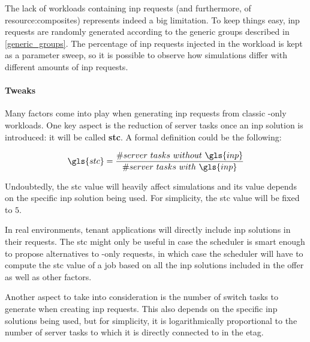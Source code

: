 The lack of workloads containing \gls{inp} requests (and furthermore, of \glspl{resource:composite}) represents indeed a big limitation.
To keep things easy, \gls{inp} requests are randomly generated according to the generic groups described in \autoref{generic_groups}.
The percentage of \gls{inp} requests injected in the workload is kept as a parameter sweep, so it is possible to observe how simulations differ with different amounts of \gls{inp} requests.

\paragraph{Tweaks} \label{workload_tweaks}
Many factors come into play when generating \gls{inp} requests from classic -only workloads.
One key aspect is the reduction of server tasks once an \gls{inp} solution is introduced: it will be called \textbf{\gls{stc}}.
A formal definition could be the following:

\begin{equation}
\label{stc_formula}
\gls{stc}=\dfrac{\#server\ tasks\ without\ \gls{inp}}{\#server\ tasks\ with\ \gls{inp}}
\end{equation}

Undoubtedly, the \gls{stc} value will heavily affect simulations and its value depends on the specific \gls{inp} solution being used.
For simplicity, the \gls{stc} value will be fixed to $5$. %

In real environments, tenant applications will directly include \gls{inp} solutions in their requests.
The \gls{stc} might only be useful in case the scheduler is smart enough to propose alternatives to -only requests, in which case the scheduler will have to compute the \gls{stc} value of a job based on all the \gls{inp} solutions included in the offer as well as other factors.

Another aspect to take into consideration is the number of switch tasks to generate when creating \gls{inp} requests.
This also depends on the specific \gls{inp} solutions being used, but for simplicity, it is logarithmically proportional to the number of server tasks to which it is directly connected to in the \gls{etag}. %

